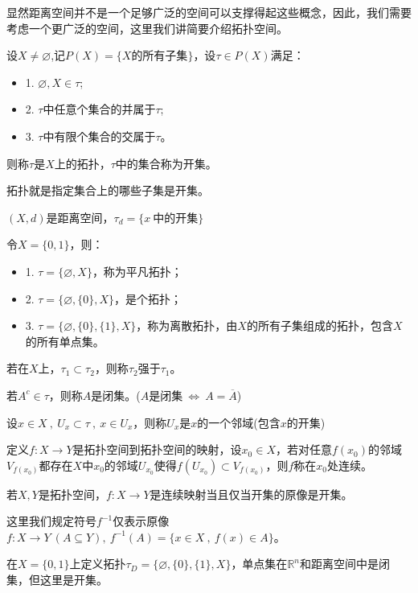 显然距离空间并不是一个足够广泛的空间可以支撑得起这些概念，因此，我们需要考虑一个更广泛的空间，这里我们讲简要介绍拓扑空间。
\begin{definition}[拓扑]
设$X \neq \varnothing$,记$P(X)=\{X\text{的所有子集}\}$，设$\tau \in P(X)$满足：
\begin{itemize}
\item 1. $\varnothing,X \in \tau$;
\item 2. $\tau$中任意个集合的并属于$\tau$;
\item 3. $\tau$中有限个集合的交属于$\tau$。
\end{itemize}
则称$\tau$是$X$上的拓扑，$\tau$中的集合称为开集。
\end{definition}
拓扑就是指定集合上的哪些子集是开集。
\begin{example}
\quad $(X,d)$是距离空间，$\tau_d=\{x \ \text{中的开集}\}$
\end{example}
\begin{example}
\quad  令$X=\{0,1\}$，则：
\begin{itemize}
    \item 1. $\tau=\{\varnothing,X\}$，称为平凡拓扑；
    \item 2. $\tau=\{\varnothing,\{0\},X\}$，是个拓扑；
    \item 3. $\tau=\{\varnothing,\{0\},\{1\},X\}$，称为离散拓扑，由$X$的所有子集组成的拓扑，包含$X$的所有单点集。
\end{itemize}
\end{example}

若在$X$上，$\tau_1 \subset \tau_2$，则称$\tau_2$强于$\tau_1$。
\begin{definition}[闭集]
    若$A^c \in \tau$，则称$A$是闭集。($A$是闭集$\ \Leftrightarrow \ A=\overline{A}$)
\end{definition}
\begin{definition}[邻域]
    设$x \in X \ , \ U_x \subset \tau \ , \ x \in U_x$，则称$U_x$是$x$的一个邻域(包含$x$的开集)
\end{definition}
\begin{definition}[连续]
    定义$f:X \to Y$是拓扑空间到拓扑空间的映射，设$x_0 \in X$，若对任意$f(x_0)$的邻域$V_{f(x_0)}$都存在$X$中$x_0$的邻域$U_{x_0}$使得$f(U_{x_0}) \subset V_{f(x_0)}$，则$f$称在$x_0$处连续。
\end{definition}
\begin{theorem}
    若$X,Y$是拓扑空间，$f:X \to Y$是连续映射当且仅当开集的原像是开集。
\end{theorem}
这里我们规定符号$f^{-1}$仅表示原像$f:X \to Y \ (A \subseteq Y), \ f^{-1}(A)=\{x \in X \ , \ f(x) \in A\}$。
\begin{example}
\quad 在$X=\{0,1\}$上定义拓扑$\tau_D=\{\varnothing,\{0\},\{1\},X\}$，单点集在$\mathbb{R}^n$和距离空间中是闭集，但这里是开集。
\end{example}

